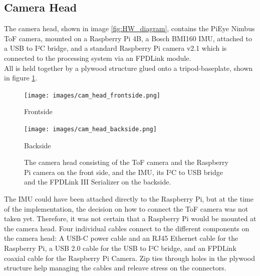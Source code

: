 \subsection{Camera Head}
\label{sec:camHead}
The camera head, shown in image \ref{fig:HW_diagram}, contains the PiEye Nimbus ToF camera, mounted on a Raspberry Pi 4B, a Bosch BMI160 IMU, attached to a USB to I²C bridge, and a standard Raspberry Pi camera v2.1 which is connected to the processing system via an FPDLink module.\\
All is held together by a plywood structure glued onto a tripod-baseplate, shown in figure \ref{fig:cameraHead}. 
\begin{figure}[H]
    \centering
    \begin{minipage}[b]{0.45\textwidth}
      \texttt{[image: images/cam\_head\_frontside.png]}
      \caption{Frontside}
      \label{fig:cameraHeadfront} 
    \end{minipage} %
    \begin{minipage}[b]{0.45\textwidth}
      \texttt{[image: images/cam\_head\_backside.png]} 
      \caption{Backside}
      \label{fig:cameraHeadback} 
    \end{minipage}
    \caption{The camera head consisting of the ToF camera and the Raspberry Pi camera on the front side, and the IMU, its I²C to USB bridge and the FPDLink III Serializer on the backside.}
    \label{fig:cameraHead}
  \end{figure}
The IMU could have been attached directly to the Raspberry Pi, but at the time of the implementation, the decision on how to connect the ToF camera was not taken yet. Therefore, it was not certain that a Raspberry Pi would be mounted at the camera head.
Four individual cables connect to the different components on the camera head: A USB-C power cable and an RJ45 Ethernet cable for the Raspberry Pi, a USB 2.0 cable for the USB to I²C bridge, and an FPDLink coaxial cable for the Raspberry Pi Camera. Zip ties through holes in the plywood structure help managing the cables and releave stress on the connectors.


